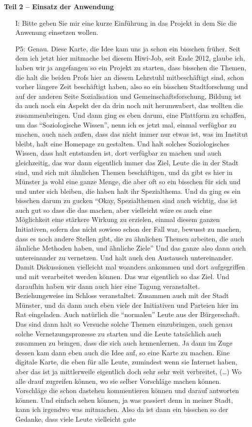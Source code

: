 \textbf{Teil 2 -- Einsatz der Anwendung}
\begin{itemize}
    \item[I:] Bitte geben Sie mir eine kurze Einf{\"u}hrung in das Projekt in dem Sie die Anwenung einsetzen wollen.
    \item[P5:] Genau. Diese Karte, die Idee kam uns ja schon ein bisschen fr{\"u}her. Seit dem ich jetzt hier mitmache bei diesem Hiwi-Job, seit Ende 2012, glaube ich, haben wir ja angefangen so ein Projekt zu starten, dass bisschen die Themen, die halt die beiden Profs hier an diesem Lehrstuhl mitbesch{\"a}ftigt sind, schon vorher l{\"a}ngere Zeit besch{\"a}ftigt haben, also so ein bisschen Stadtforschung und auf der anderen Seite Sozialisation und Gemeinschaftsforschung, Bildung ist da auch noch ein Aspekt der da drin noch mit herumwabert, das wollten die zusammenbringen. Und dann ging es eben darum, eine Plattform zu schaffen, um das "`Soziologische Wissen"', nenn ich es jetzt mal, einmal verf{\"u}gbar zu machen, auch nach au{\ss}en, dass das nicht immer nur etwas ist, was im Institut bleibt, halt eine Homepage zu gestalten. Und halt solches Soziologisches Wissen, dass halt entstanden ist, dort verf{\"u}gbar zu machen und auch gleichzeitig, das war dann eigentlich immer das Ziel, Leute die in der Stadt sind, und sich mit {\"a}hnlichen Themen besch{\"a}ftigen, und da gibt es hier in M{\"u}nster ja wohl eine ganze Menge, die aber oft so ein bisschen f{\"u}r sich und und unter sich bleiben, die haben halt ihr Spezialthema. Und da ging es ein bisschen darum zu gucken "`Okay, Spezialthemen sind auch wichtig, das ist auch gut so dass die das machen, aber vielleicht w{\"a}re es auch eine M{\"o}glichkeit eine st{\"a}rkere Wirkung zu erzielen, einmal diesem ganzen Initiativen, sofern das nicht sowieso schon der Fall war, bewusst zu machen, dass es noch andere Stellen gibt, die zu {\"a}hnlichen Themen arbeiten, die auch {\"a}hnliche Methoden haben, und {\"a}hnliche Ziele"' Und das ganze also dann auch untereinander zu vernetzen. Und halt auch den Austausch untereinander. Damit Diskussionen vielleicht mal woanders ankommen und dort aufgegriffen und mit verarbeitet werden k{\"o}nnen. Das war eigentlich so das Ziel. Und daraufhin haben wir dann auch hier eine Tagung veranstaltet. Beziehungsweise im Schloss veranstaltet. Zusammen auch mit der Stadt M{\"u}nster, und da dann auch eben viele der Initiativen und Parteien hier im Rat eingeladen. Auch nat{\"u}rlich die "`normalen"' Leute aus der B{\"u}rgerschaft. Das sind dann halt so Versuche solche Themen einzubringen, auch genau solche Vernetzungsprozesse zu starten und die Leute tats{\"a}chlich auch zusammen zu bringen, dass die sich auch kennenlernen. Ja dann im Zuge dessen kam dann eben auch die Idee auf, so eine Karte zu machen. Eine digitale Karte, die eben f{\"u}r alle Leute, zumindest wenn sie Internet haben, aber das ist ja mittlerweile eigentlich doch sehr sehr weit verbreitet, (\dots) Wo alle drauf zugreifen k{\"o}nnen, wo sie selber Vorschl{\"a}ge machen k{\"o}nnen. Vorschl{\"a}ge die schon dastehen kommentieren k{\"o}nnen und darauf antworten k{\"o}nnen. Und einfach sehen k{\"o}nnen, ja was passiert denn in meiner Stadt, kann ich irgendwo was mitmachen. Also da ist dann ein bisschen so der Gedanke, dass viele Leute vielleicht gute 
\end{itemize}
